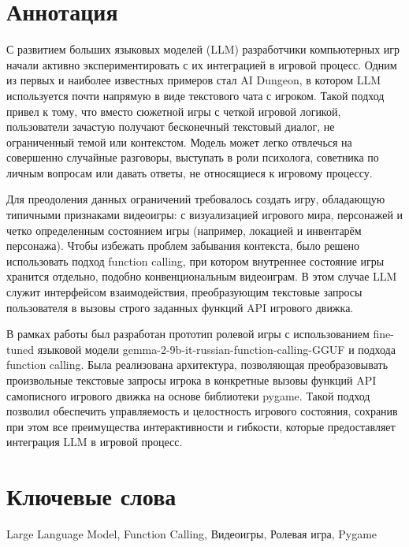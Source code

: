 \documentclass[14pt]{extarticle}
\begin{document}
\section*{Аннотация}
С развитием больших языковых моделей (LLM) разработчики компьютерных игр начали активно экспериментировать с их интеграцией в игровой процесс. Одним из первых и наиболее известных примеров стал AI Dungeon, в котором LLM используется почти напрямую в виде текстового чата с игроком. Такой подход привел к тому, что вместо сюжетной игры с четкой игровой логикой, пользователи зачастую получают бесконечный текстовый диалог, не ограниченный темой или контекстом. Модель может легко отвлечься на совершенно случайные разговоры, выступать в роли психолога, советника по личным вопросам или давать ответы, не относящиеся к игровому процессу.

Для преодоления данных ограничений требовалось создать игру, обладающую типичными признаками видеоигры: с визуализацией игрового мира, персонажей и четко определенным состоянием игры (например, локацией и инвентарём персонажа). Чтобы избежать проблем забывания контекста, было решено использовать подход function calling, при котором внутреннее состояние игры хранится отдельно, подобно конвенциональным видеоиграм. В этом случае LLM служит интерфейсом взаимодействия, преобразующим текстовые запросы пользователя в вызовы строго заданных функций API игрового движка.

В рамках работы был разработан прототип ролевой игры с использованием fine-tuned языковой модели gemma-2-9b-it-russian-function-calling-GGUF и подхода function calling. Была реализована архитектура, позволяющая преобразовывать произвольные текстовые запросы игрока в конкретные вызовы функций API самописного игрового движка на основе библиотеки pygame. Такой подход позволил обеспечить управляемость и целостность игрового состояния, сохранив при этом все преимущества интерактивности и гибкости, которые предоставляет интеграция LLM в игровой процесс.
\section*{Ключевые слова}
Large Language Model, Function Calling, Видеоигры, Ролевая игра, Pygame
\newpage
\end{document}

